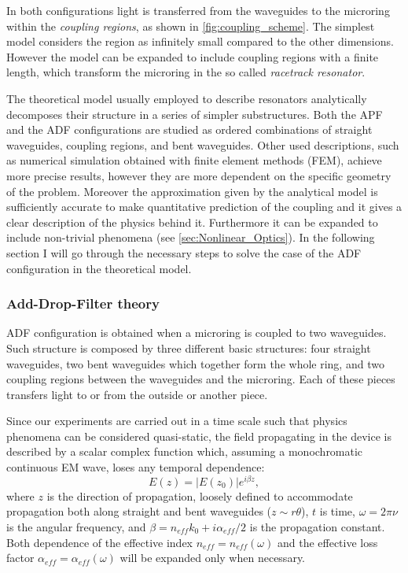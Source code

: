 In both configurations light is transferred from the waveguides to the microring within the \textit{coupling regions}, as shown in \autoref{fig:coupling_scheme}.
The simplest model considers the region as infinitely small compared to the other dimensions.
However the model can be expanded to include coupling regions with a finite length, which transform the microring in the so called \textit{racetrack resonator}.

The theoretical model usually employed to describe resonators analytically decomposes their structure in a series of simpler substructures.
Both the APF and the ADF configurations are studied as ordered combinations of straight waveguides, coupling regions, and bent waveguides.
Other used descriptions, such as numerical simulation obtained with finite element methods (FEM), achieve more precise results, however they are more dependent on the specific geometry of the problem.
Moreover the approximation given by the analytical model is sufficiently accurate to make quantitative prediction of the coupling and it gives a clear description of the physics behind it.
Furthermore it can be expanded to include non-trivial phenomena (see \autoref{sec:Nonlinear_Optics}).
In the following section I will go through the necessary steps to solve the case of the ADF configuration in the theoretical model.

\subsubsection{Add-Drop-Filter theory}
\label{sssec:Add-Drop-Filter_theory}
ADF configuration is obtained when a microring is coupled to two waveguides.
Such structure is composed by three different basic structures: four straight waveguides, two bent waveguides which together form the whole ring, and two coupling regions between the waveguides and the microring.
Each of these pieces transfers light to or from the outside or another piece.

Since our experiments are carried out in a time scale such that physics phenomena can be considered quasi-static, the field propagating in the device is described by a scalar complex function which, assuming a monochromatic continuous EM wave, loses any temporal dependence:
\begin{equation}
	E(z) = |E(z_0)|e^{i\beta z},
\end{equation}
where $z$ is the direction of propagation, loosely defined to accommodate propagation both along straight and bent waveguides ($z\sim r\theta$), $t$ is time, $\omega=2\pi\nu$ is the angular frequency, and $\beta = n_{eff}k_0+i\alpha_{eff}/2$ is the propagation constant.
Both dependence of the effective index $n_{eff}=n_{eff}\left(\omega\right)$ and the effective loss factor $\alpha_{eff}=\alpha_{eff}\left(\omega\right)$ will be expanded only when necessary.

